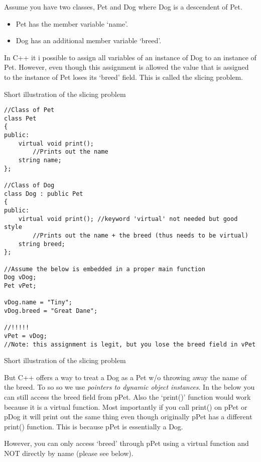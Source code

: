 Assume you have two classes, Pet and Dog where Dog is a descendent of Pet.
\begin{itemize}
	\item Pet has the member variable `name'.
	\item Dog has an additional member variable `breed'.
\end{itemize}

In C++ it i possible to assign all variables of an instance of Dog to an instance of Pet. However,
even though this assignment is allowed the value that is assigned to the instance of Pet loses its
`breed' field. This is called the slicing problem.

\noindent
Short illustration of the slicing problem
\begin{listing}[H]
\begin{verbatim}
//Class of Pet
class Pet
{
public:
	virtual void print();
		//Prints out the name
	string name;
};

//Class of Dog
class Dog : public Pet
{
public:
	virtual void print(); //keyword 'virtual' not needed but good style
		//Prints out the name + the breed (thus needs to be virtual)
	string breed;
};

//Assume the below is embedded in a proper main function
Dog vDog;
Pet vPet;

vDog.name = "Tiny";
vDog.breed = "Great Dane";

//!!!!!
vPet = vDog;
//Note: this assignment is legit, but you lose the breed field in vPet
\end{verbatim}
\caption{Short illustration of the slicing problem}
\label{source_code_1}
\end{listing}


But C++ offers a way to treat a Dog as a Pet w/o throwing away the name of the breed.
To so so we use \emph{pointers to dynamic object instances}. In the below you can still
access the breed field from pPet. Also the `print()' function would work because it is a
virtual function. Most importantly if you call print() on pPet or pDog it will print out the same
thing even though originally pPet has a different print() function. This is because pPet is
essentially a Dog.

However, you can only access `breed' through pPet using a virtual function and NOT directly
by name (please see below).

